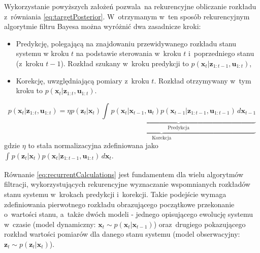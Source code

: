 Wykorzystanie powyższych założeń pozwala~na rekurencyjne obliczanie rozkładu z~równiania \ref{eq:targetPosterior}. W~otrzymanym w~ten sposób rekurencyjnym algorytmie filtru Bayesa można wyróżnić dwa zasadnicze kroki: 
\begin{itemize}
	\item Predykcję, polegającą na znajdowaniu przewidywanego rozkładu stanu systemu w kroku $t$ na podstawie sterowania w~kroku $t$ i~poprzedniego stanu (z~kroku $t-1$). Rozkład szukany w~kroku predykcji to $p(\boldsymbol{x}_t|\boldsymbol{z}_{1:t-1},\boldsymbol{u}_{1:t})$,
	\item Korekcję, uwzględniającą pomiary z~kroku $t$. Rozkład otrzymywany w~tym kroku to $p(\boldsymbol{x}_t|\boldsymbol{z}_{1:t},\boldsymbol{u}_{1:t})$.
\end{itemize}

\begin{equation} \label{eq:recurrentCalculations}
	p(\boldsymbol{x}_t|\boldsymbol{z}_{1:t},\boldsymbol{u}_{1:t})=\underbrace{\eta p(\boldsymbol{z}_t|\boldsymbol{x}_t)\underbrace{\int_{}^{}p(\boldsymbol{x}_t|\boldsymbol{x}_{t-1},\boldsymbol{u}_t)p(\boldsymbol{x}_{t-1}|\boldsymbol{z}_{1:t-1},\boldsymbol{u}_{1:t-1}) \,d\boldsymbol{x}_{t-1}}_{\textrm{Predykcja}}}_{\textrm{Korekcja}}
\end{equation}
gdzie $\eta$ to stała normalizacyjna zdefiniowana jako $\int_{}^{}p(\boldsymbol{z}_t|\boldsymbol{x}_{t})p(\boldsymbol{x}_t|\boldsymbol{z}_{1:t-1},\boldsymbol{u}_{1:t}) \,d\boldsymbol{x}_t$.
\par Równanie \ref{eq:recurrentCalculations} jest fundamentem dla wielu algorytmów filtracji, wykorzystujących rekurencyjne wyznaczanie wspomnianych rozkładów stanu systemu w~krokach predykcji i~korekcji. Takie podejście wymaga zdefiniowania pierwotnego rozkładu obrazującego początkowe przekonanie o~wartości stanu, a~także dwóch modeli -  jednego opisującego ewolucję systemu w~czasie (model dynamiczny: $\boldsymbol{x}_t\sim p(\boldsymbol{x}_t|\boldsymbol{x}_{t-1})$) oraz~drugiego pokazującego rozkład wartości pomiarów dla danego stanu systemu (model obserwacyjny: $\boldsymbol{z}_t\sim p(\boldsymbol{z}_t|\boldsymbol{x}_t)$).
